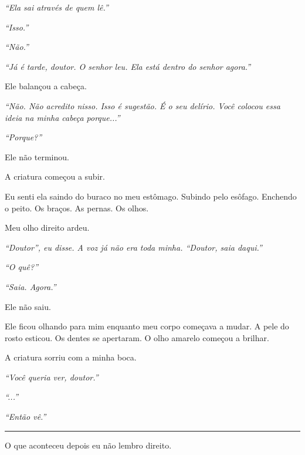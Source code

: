 \noindent \textit{\textquotedblleft{}Ela sai através de quem lê.\textquotedblright{}}

\noindent \textit{\textquotedblleft{}Isso.\textquotedblright{}}

\noindent \textit{\textquotedblleft{}Não.\textquotedblright{}}

\noindent \textit{\textquotedblleft{}Já é tarde, doutor. O senhor leu. Ela está dentro do senhor agora.\textquotedblright{}}

\noindent Ele balançou a cabeça.

\noindent \textit{\textquotedblleft{}Não. Não acredito nisso. Isso é sugestão. É o seu delírio. Você colocou essa ideia na minha cabeça porque...\textquotedblright{}}

\noindent \textit{\textquotedblleft{}Porque?\textquotedblright{}}

\noindent Ele não terminou.

\noindent A criatura começou a subir.

\noindent Eu senti ela saindo do buraco no meu estômago. Subindo pelo esôfago. Enchendo o peito. Os braços. As pernas. Os olhos.

\noindent Meu olho direito ardeu.

\noindent \textit{\textquotedblleft{}Doutor\textquotedblright{}\textit{, eu disse. A voz já não era toda minha. }\textquotedblleft{}Doutor, saia daqui.\textquotedblright{}}

\noindent \textit{\textquotedblleft{}O quê?\textquotedblright{}}

\noindent \textit{\textquotedblleft{}Saia. Agora.\textquotedblright{}}

\noindent Ele não saiu.

\noindent Ele ficou olhando para mim enquanto meu corpo começava a mudar. A pele do rosto esticou. Os dentes se apertaram. O olho amarelo começou a brilhar.

\noindent A criatura sorriu com a minha boca.

\noindent \textit{\textquotedblleft{}Você queria ver, doutor.\textquotedblright{}}

\noindent \textit{\textquotedblleft{}...\textquotedblright{}}

\noindent \textit{\textquotedblleft{}Então vê.\textquotedblright{}}

\vspace{0.5em}\noindent\rule{\textwidth}{0.5pt}\vspace{0.5em}

\noindent O que aconteceu depois eu não lembro direito.

